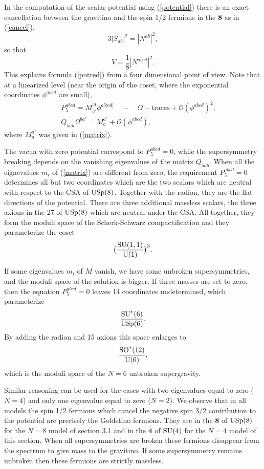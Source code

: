 \documentclass[a4paper,12pt]{article}
\begin{document}
In the computation of the scalar potential using (\ref{potential}) there is an exact cancellation
between
the gravitino and the spin 1/2 fermions in the {\bf 8} as in (\ref{cancel}),
$$3|S_{ab}|^2=|N^{ab}|^2,$$
so that $$V=\frac{1}{8}|N^{abcd}|^2.$$
This explains formula (\ref{potred}) from a four dimensional point of view. Note that at a linearized
level (near the origin of the coset, where the exponential coordinates  $\phi^{abcd}$ are small),
\begin{eqnarray*}&&P_5^{abcd}= M^{[a}_{a'}\phi^{a'bcd]}\quad - \quad \Omega\!\!-\!\!\mathrm{traces}
+\mathcal{O}(\phi^{abcd})^2,\\&&Q_{5ab}\Omega^{ba'}= M_a^{a'}+ \mathcal{O}(\phi^{abcd}),\end{eqnarray*}
where $M_a^{a'}$ was given in (\ref{matrix}).

The vacua with zero potential correspond to $P_5^{abcd}=0$, while
the supersymmetry breaking depends on the vanishing eigenvalues of
the matrix  $Q_{5ab}$. When all the eignevalues $m_i$ of
(\ref{matrix}) are different from zero, the requirement
$P_5^{abcd}=0$ determines all but two coordinates which are the
two scalars which are neutral with respect to the CSA of
$\mathrm{USp}(8)$.  Together with the radion, they are the flat
directions of the potential. There are three additional massless
scalars, the three axions in the 27 of $\mathrm{USp}(8)$ which are
neutral under the CSA. All together, they form the moduli space of
the Scherk-Schwarz compactification and they parameterize the
coset $$\bigl(\frac{\mathrm{SU}(1,1)}{\mathrm{U}(1)}\bigr)^3.$$

If some eigenvalues $m_i$ of $M$ vanish, we have some unbroken
supersymmetries, and the moduli space of the solution is bigger.
If three masses are set to zero, then the equation $P_5^{abcd}=0$
leaves 14 coordinates undetermined, which parameterize
$$\frac{\mathrm{SU}^*(6)}{\mathrm{USp}(6)},$$
 By adding the radion and 15 axions this space enlarges to $$\frac{\mathrm{SO}^*(12)}{\mathrm{U}(6)},$$ which is
the
moduli space of the $N=6$ unbroken supergravity.

 Similar reasoning can be used for the cases with two eigenvalues equal to zero ($N=4$) and only one
eigenvalue equal to zero ($N=2$). We observe that in all models the spin 1/2 fermions which cancel
the negative spin 3/2 contribution to the potential are precisely the Goldstino fermions. They are in
the {\bf 8} of $\mathrm{USp}(8)$ for  the $N=8$ model of section 3.1 and in the $\bar{\mathbf{4}}$ of
$\mathrm{SU}(4)$ for the $N=4$ model of this section. When all supersymmetries are broken these fermions
disappear from the spectrum to give mass to the gravitino. If some supersymmetry remains unbroken
then these fermions are strictly massless.
\end{document}
